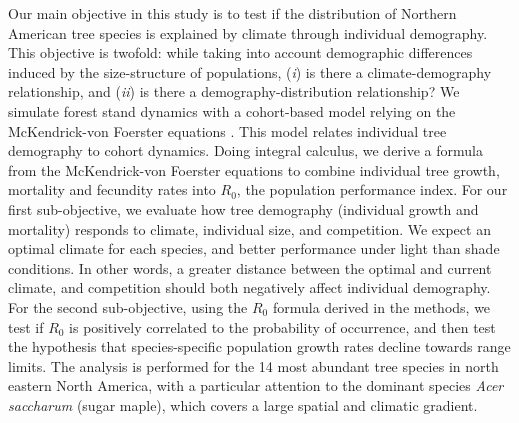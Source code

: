 Our main objective in this study is to test if the distribution of Northern
American tree species is explained by climate through individual demography. This objective is twofold: while taking into account demographic differences induced by the size-structure of populations, (\textit{i}) is there a climate-demography relationship, and (\textit{ii}) is there a demography-distribution relationship? We simulate forest stand dynamics with a cohort-based model relying on the McKendrick-von Foerster equations \citep{Strigul2008}. This model relates individual tree demography to cohort dynamics. Doing integral calculus, we derive a formula from the McKendrick-von Foerster equations to combine individual tree growth, mortality and fecundity rates into $ R_0 $, the population performance index. For our first sub-objective, we evaluate how tree demography (individual growth and mortality) responds to climate, individual size, and competition. We expect an optimal climate for each species, and better performance under light than shade conditions. In other words, a greater distance between the optimal and current climate, and competition should both negatively affect individual demography. For the second sub-objective, using the $ R_0 $ formula derived in the methods, we test if $ R_0 $ is positively correlated to the probability of occurrence, and then test the hypothesis that species-specific population growth rates decline towards range limits. The analysis is performed for the 14 most abundant tree species in north eastern North America, with a particular attention to the dominant species \textit{Acer saccharum} (sugar maple), which covers a large spatial and climatic gradient.


